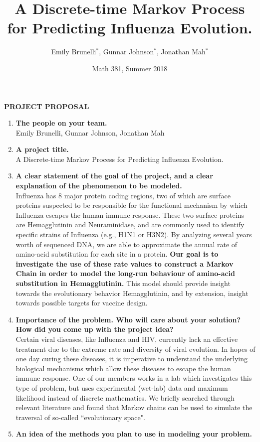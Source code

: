 \documentclass[12pt]{article}
\title{A Discrete-time Markov Process for Predicting Influenza Evolution.
}
\author{Emily Brunelli$^*$, Gunnar Johnson$^*$, Jonathan Mah$^*$}
\date{Math 381, Summer 2018}
\begin{document}
\begin{center}
    \textbf{PROJECT PROPOSAL}
\end{center}

\begin{enumerate}
    \item \textbf{The people on your team.}\\
    Emily Brunelli, Gunnar Johnson, Jonathan Mah
    \item \textbf{A project title.}\\
    A Discrete-time Markov Process for Predicting Influenza Evolution.
    \item \textbf{A clear statement of the goal of the project, and a clear explanation of the phenomenon to be modeled.}\\
    Influenza has 8 major protein coding regions, two of which are surface proteins suspected to be responsible for the functional mechanism by which Influenza escapes the human immune response. These two surface proteins are Hemagglutinin and Neuraminidase, and are commonly used to identify specific strains of Influenza (e.g., H1N1 or H3N2). By analyzing several years worth of sequenced DNA, we are able to approximate the annual rate of amino-acid substitution for each site in a protein. \textbf{Our goal is to investigate the use of these rate values to construct a Markov Chain in order to model the long-run behaviour of amino-acid substitution in Hemagglutinin.} This model should provide insight towards the evolutionary behavior Hemagglutinin, and by extension, insight towards possible targets for vaccine design.
    \item \textbf{Importance of the problem. Who will care about your solution? How did you come up with the project idea?}\\
    Certain viral diseases, like Influenza and HIV, currently lack an effective treatment due to the extreme rate and diversity of viral evolution. In hopes of one day curing these diseases, it is imperative to understand the underlying biological mechanisms which allow these diseases to escape the human immune response. One of our members works in a lab which investigates this type of problem, but uses experimental (wet-lab) data and maximum likelihood instead of discrete mathematics. We briefly searched through relevant literature and found that Markov chains can be used to simulate the traversal of so-called ``evolutionary space". 
    \item \textbf{An idea of the methods you plan to use in modeling your problem.}\\

\end{enumerate}
\end{document}
